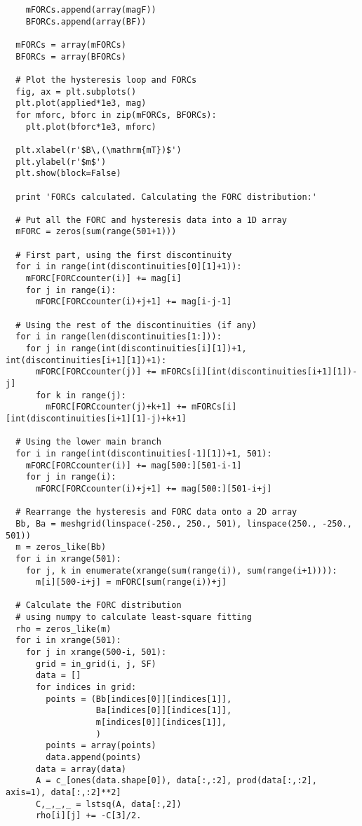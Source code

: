 \begin{lstlisting}
    mFORCs.append(array(magF))
    BFORCs.append(array(BF))

  mFORCs = array(mFORCs)
  BFORCs = array(BFORCs)

  # Plot the hysteresis loop and FORCs
  fig, ax = plt.subplots()
  plt.plot(applied*1e3, mag)
  for mforc, bforc in zip(mFORCs, BFORCs):
    plt.plot(bforc*1e3, mforc)

  plt.xlabel(r'$B\,(\mathrm{mT})$')
  plt.ylabel(r'$m$')
  plt.show(block=False)

  print 'FORCs calculated. Calculating the FORC distribution:'

  # Put all the FORC and hysteresis data into a 1D array
  mFORC = zeros(sum(range(501+1)))

  # First part, using the first discontinuity
  for i in range(int(discontinuities[0][1]+1)):
    mFORC[FORCcounter(i)] += mag[i]
    for j in range(i):
      mFORC[FORCcounter(i)+j+1] += mag[i-j-1]

  # Using the rest of the discontinuities (if any)
  for i in range(len(discontinuities[1:])):
    for j in range(int(discontinuities[i][1])+1, int(discontinuities[i+1][1])+1):
      mFORC[FORCcounter(j)] += mFORCs[i][int(discontinuities[i+1][1])-j]
      for k in range(j):
        mFORC[FORCcounter(j)+k+1] += mFORCs[i][int(discontinuities[i+1][1]-j)+k+1]

  # Using the lower main branch
  for i in range(int(discontinuities[-1][1])+1, 501):
    mFORC[FORCcounter(i)] += mag[500:][501-i-1]
    for j in range(i):
      mFORC[FORCcounter(i)+j+1] += mag[500:][501-i+j]

  # Rearrange the hysteresis and FORC data onto a 2D array
  Bb, Ba = meshgrid(linspace(-250., 250., 501), linspace(250., -250., 501))
  m = zeros_like(Bb)
  for i in xrange(501):
    for j, k in enumerate(xrange(sum(range(i)), sum(range(i+1)))):
      m[i][500-i+j] = mFORC[sum(range(i))+j]

  # Calculate the FORC distribution
  # using numpy to calculate least-square fitting
  rho = zeros_like(m)
  for i in xrange(501):
    for j in xrange(500-i, 501):
      grid = in_grid(i, j, SF)
      data = []
      for indices in grid:
        points = (Bb[indices[0]][indices[1]],
                  Ba[indices[0]][indices[1]],
                  m[indices[0]][indices[1]],
                  )
        points = array(points)
        data.append(points)
      data = array(data)
      A = c_[ones(data.shape[0]), data[:,:2], prod(data[:,:2], axis=1), data[:,:2]**2]
      C,_,_,_ = lstsq(A, data[:,2])
      rho[i][j] += -C[3]/2.


\end{lstlisting}
